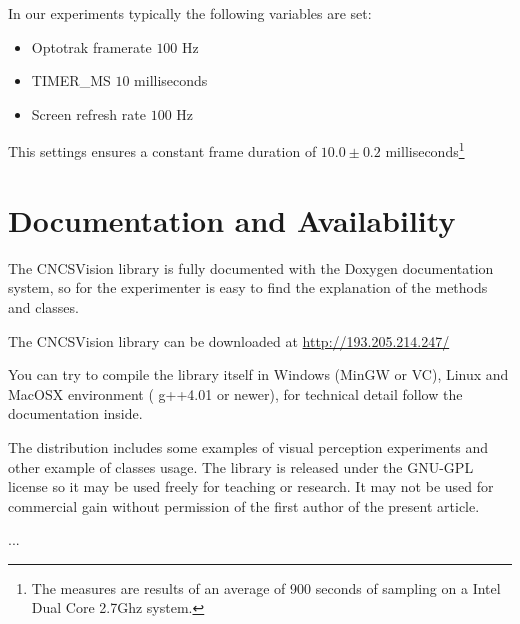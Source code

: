 \documentclass[acmtocl,acmnow]{acmtrans2m}
\begin{document}
In our experiments typically the following variables are set:
\begin{itemize}
 \item Optotrak framerate $100$ Hz
 \item TIMER\_MS $10$ milliseconds
 \item Screen refresh rate $100$ Hz
\end{itemize}
This settings ensures a constant frame duration of $10.0 \pm 0.2$ milliseconds\footnote{The measures are results of an average of 900 seconds of sampling on a Intel Dual Core 2.7Ghz system.}

\section{Documentation and Availability}
The CNCSVision library is fully documented with the Doxygen documentation
system, so for the experimenter is easy to find the explanation of the methods
and classes.

The CNCSVision library can be downloaded at \url{http://193.205.214.247/}

You can try to compile the library itself in Windows (MinGW or VC), Linux and
MacOSX environment ( g++4.01 or newer), for technical detail follow the
documentation inside.

The distribution includes some examples of visual perception experiments and
other example of classes usage.
The library is released under the GNU-GPL license so it may be used freely for
teaching or research. It may not be used for commercial gain without 
permission of the first author of the present article.


\begin{received}
...
\end{received}
\end{document}
